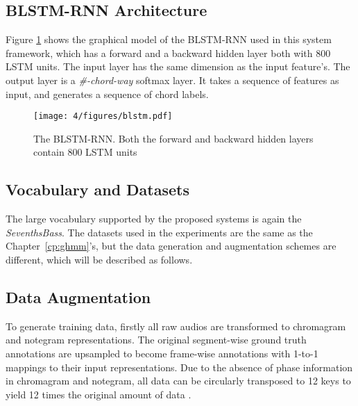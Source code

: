 \subsection{BLSTM-RNN Architecture} \label{sec:4-blstmrnnarch}
Figure \ref{fig:4-blstm} shows the graphical model of the BLSTM-RNN used in this system framework, which has a forward and a backward hidden layer both with 800 LSTM units. The input layer has the same dimension as the input feature's. The output layer is a \textit{\#-chord-way} softmax layer. It takes a sequence of features as input, and generates a sequence of chord labels.

\begin{figure}[htb]
	\centering
	\texttt{[image: 4/figures/blstm.pdf]}
	\caption{The BLSTM-RNN. Both the forward and backward hidden layers contain 800 LSTM units}
	\label{fig:4-blstm}
\end{figure}

\subsection{Vocabulary and Datasets}
The large vocabulary supported by the proposed systems is again the \textit{SeventhsBass}. The datasets used in the experiments are the same as the Chapter~\ref{cp:ghmm}'s, but the data generation and augmentation schemes are different, which will be described as follows.

\subsection{Data Augmentation}
To generate training data, firstly all raw audios are transformed to chromagram and notegram representations. The original segment-wise ground truth annotations are upsampled to become frame-wise annotations with 1-to-1 mappings to their input representations. Due to the absence of phase information in chromagram and notegram, all data can be circularly transposed to 12 keys to yield 12 times the original amount of data \cite{humphrey2012rethinking}.

